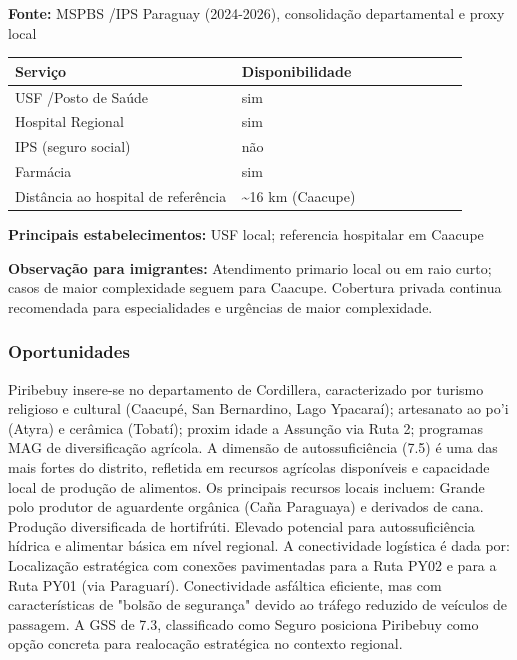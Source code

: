 \textbf{Fonte:} MSPBS /\allowbreak  IPS Paraguay (2024-2026), consolidação
departamental e proxy local

{\def\LTcaptype{none} %
\begin{longtable}{@{}>{\raggedright\arraybackslash}p{0.45\linewidth} >{\raggedright\arraybackslash}p{0.45\linewidth}@{}}
\toprule\noalign{}
Serviço & Disponibilidade \\
\midrule\noalign{}
\endhead
\bottomrule\noalign{}
\endlastfoot
USF /\allowbreak  Posto de Saúde & sim \\
Hospital Regional & sim \\
IPS (seguro social) & não \\
Farmácia & sim \\
Distância ao hospital de referência & \textasciitilde16 km (Caacupe) \\
\end{longtable}
}

\textbf{Principais estabelecimentos:} USF local; referencia hospitalar
em Caacupe

\textbf{Observação para imigrantes:} Atendimento primario local ou em
raio curto; casos de maior complexidade seguem para Caacupe. Cobertura
privada continua recomendada para especialidades e urgências de maior
complexidade.
\newpage

\subsubsection*{Oportunidades}\label{oport-piribebuy-0314}
Piribebuy insere-se no departamento de Cordillera, caracterizado por turismo religioso e cultural (Caacupé, San Bernardino, Lago Ypacaraí); artesanato ao po'i (Atyra) e cerâmica (Tobatí); proxim idade a Assunção via Ruta 2; programas MAG de diversificação agrícola. A dimensão de autossuficiência (7.5) é uma das mais fortes do distrito, refletida em recursos agrícolas disponíveis e capacidade local de produção de alimentos. Os principais recursos locais incluem: Grande polo produtor de aguardente orgânica (Caña Paraguaya) e derivados de cana. Produção diversificada de hortifrúti. Elevado potencial para autossuficiência hídrica e alimentar básica em nível regional. A conectividade logística é dada por: Localização estratégica com conexões pavimentadas para a Ruta PY02 e para a Ruta PY01 (via Paraguarí). Conectividade asfáltica eficiente, mas com características de "bolsão de segurança" devido ao tráfego reduzido de veículos de passagem. A GSS de 7.3, classificado como Seguro posiciona Piribebuy como opção concreta para realocação estratégica no contexto regional.

